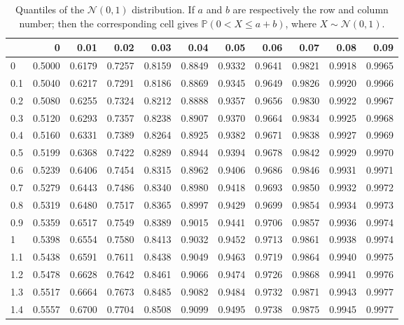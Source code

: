 \documentclass[
  12pt,
]{book}
\theoremstyle{definition}
\theoremstyle{definition}
\theoremstyle{definition}
\theoremstyle{definition}
\theoremstyle{remark}
\begin{document}
\begin{table}

\caption{\label{tab:Normal}Quantiles of the $\mathcal{N}(0,1)$ distribution. If $a$ and $b$ are respectively the row and column number; then the corresponding cell gives $\mathbb{P}(0<X\le a+b)$, where $X \sim \mathcal{N}(0,1)$.}
\centering
\begin{tabular}[t]{l|r|r|r|r|r|r|r|r|r|r}
\hline
  & 0 & 0.01 & 0.02 & 0.03 & 0.04 & 0.05 & 0.06 & 0.07 & 0.08 & 0.09\\
\hline
0 & 0.5000 & 0.6179 & 0.7257 & 0.8159 & 0.8849 & 0.9332 & 0.9641 & 0.9821 & 0.9918 & 0.9965\\
\hline
0.1 & 0.5040 & 0.6217 & 0.7291 & 0.8186 & 0.8869 & 0.9345 & 0.9649 & 0.9826 & 0.9920 & 0.9966\\
\hline
0.2 & 0.5080 & 0.6255 & 0.7324 & 0.8212 & 0.8888 & 0.9357 & 0.9656 & 0.9830 & 0.9922 & 0.9967\\
\hline
0.3 & 0.5120 & 0.6293 & 0.7357 & 0.8238 & 0.8907 & 0.9370 & 0.9664 & 0.9834 & 0.9925 & 0.9968\\
\hline
0.4 & 0.5160 & 0.6331 & 0.7389 & 0.8264 & 0.8925 & 0.9382 & 0.9671 & 0.9838 & 0.9927 & 0.9969\\
\hline
0.5 & 0.5199 & 0.6368 & 0.7422 & 0.8289 & 0.8944 & 0.9394 & 0.9678 & 0.9842 & 0.9929 & 0.9970\\
\hline
0.6 & 0.5239 & 0.6406 & 0.7454 & 0.8315 & 0.8962 & 0.9406 & 0.9686 & 0.9846 & 0.9931 & 0.9971\\
\hline
0.7 & 0.5279 & 0.6443 & 0.7486 & 0.8340 & 0.8980 & 0.9418 & 0.9693 & 0.9850 & 0.9932 & 0.9972\\
\hline
0.8 & 0.5319 & 0.6480 & 0.7517 & 0.8365 & 0.8997 & 0.9429 & 0.9699 & 0.9854 & 0.9934 & 0.9973\\
\hline
0.9 & 0.5359 & 0.6517 & 0.7549 & 0.8389 & 0.9015 & 0.9441 & 0.9706 & 0.9857 & 0.9936 & 0.9974\\
\hline
1 & 0.5398 & 0.6554 & 0.7580 & 0.8413 & 0.9032 & 0.9452 & 0.9713 & 0.9861 & 0.9938 & 0.9974\\
\hline
1.1 & 0.5438 & 0.6591 & 0.7611 & 0.8438 & 0.9049 & 0.9463 & 0.9719 & 0.9864 & 0.9940 & 0.9975\\
\hline
1.2 & 0.5478 & 0.6628 & 0.7642 & 0.8461 & 0.9066 & 0.9474 & 0.9726 & 0.9868 & 0.9941 & 0.9976\\
\hline
1.3 & 0.5517 & 0.6664 & 0.7673 & 0.8485 & 0.9082 & 0.9484 & 0.9732 & 0.9871 & 0.9943 & 0.9977\\
\hline
1.4 & 0.5557 & 0.6700 & 0.7704 & 0.8508 & 0.9099 & 0.9495 & 0.9738 & 0.9875 & 0.9945 & 0.9977\\

\end{tabular}
\end{table}
\end{document}
